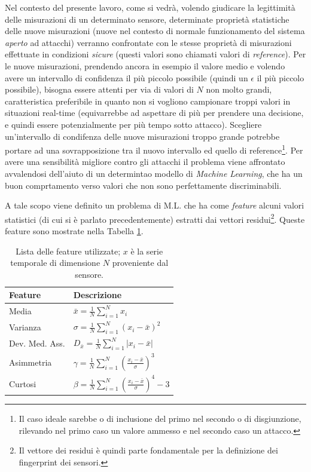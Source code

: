 \documentclass[Lau,binding=0.6cm]{sapthesis}
\begin{document}
Nel contesto del presente lavoro, come si vedr\`a, volendo giudicare la legittimit\`a delle misurazioni di un determinato sensore, determinate propriet\`a statistiche delle nuove misurazioni (nuove nel contesto di normale 
funzionamento del sistema \textit{aperto} ad attacchi) verranno confrontate con le stesse propriet\`a di misurazioni effettuate in condizioni \textit{sicure} (questi valori sono chiamati valori di \textit{reference}). 
Per le nuove misurazioni, prendendo ancora in esempio il valore medio e volendo avere un intervallo di confidenza il pi\`u piccolo possibile (quindi un $\epsilon$ il pi\`u piccolo possibile), bisogna essere attenti per via di valori di $N$ non molto grandi,
caratteristica preferibile in quanto non si vogliono campionare troppi valori in situazioni real-time (equivarrebbe ad aspettare di pi\`u per prendere una decisione, e quindi essere potenzialmente per più tempo sotto attacco).
Scegliere un'intervallo di condifenza delle nuove misurazioni troppo grande potrebbe portare ad una sovrapposizione tra il nuovo intervallo ed quello di reference\footnote{Il caso ideale sarebbe o di inclusione del primo nel secondo o di disgiunzione, rilevando nel primo caso un valore ammesso e nel secondo caso un attacco.}.
Per avere una sensibilit\`a migliore contro gli attacchi il problema viene affrontato avvalendosi dell'aiuto di un determintao modello di \textit{Machine Learning}, 
che ha un buon comprtamento verso valori che non sono perfettamente discriminabili.

A tale scopo viene definito un problema di M.L. che ha come \textit{feature} alcuni valori statistici (di cui si \`e parlato precedentemente) estratti dai vettori residui\footnote{Il vettore dei residui \`e quindi parte fondamentale per la definizione dei fingerprint dei sensori.}.
Queste feature sono mostrate nella Tabella \ref{tab:1}.

\begin{table}[tb]
    \begin{center}
    \begin{tabular}{|l|l|}
    \hline
    \textbf{Feature} & \textbf{Descrizione} \\
    \hline
    Media & $\bar{x} = \frac{1}{N}\sum_{i=1}^N x_i$ \\
    \hline
    Varianza & $\sigma = \frac{1}{N}\sum_{i=1}^N (x_i - \bar{x})^2 $ \\
    \hline
    Dev. Med. Ass. & $D_{\bar{x}} = \frac{1}{N}\sum_{i=1}^N |x_i - \bar{x}|$ \\
    \hline
    Asimmetria & $\gamma = \frac{1}{N} \sum_{i=1}^N (\frac{x_i - \bar{x}}{\sigma})^3 $ \\
    \hline
    Curtosi & $ \beta = \frac{1}{N} \sum_{i=1}^N (\frac{x_i - \bar{x}}{\sigma})^4 - 3$\\
    \hline
    \end{tabular}
    \end{center}
    \caption{Lista delle feature utilizzate; $x$ \`e la serie temporale di dimensione $N$ proveniente dal sensore.}
    \label{tab:1}
\end{table}
\end{document}
